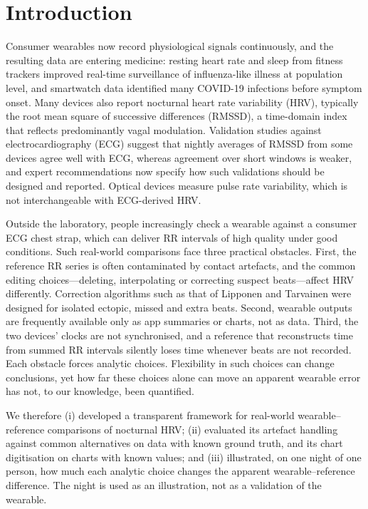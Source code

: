 \documentclass[11pt,a4paper]{article}
\begin{document}
\section{Introduction}
Consumer wearables now record physiological signals continuously, and the resulting data are entering medicine: resting heart rate and sleep from fitness trackers improved real-time surveillance of influenza-like illness at population level,\autocite{radin2020} and smartwatch data identified many COVID-19 infections before symptom onset.\autocite{mishra2020} Many devices also report nocturnal heart rate variability (HRV), typically the root mean square of successive differences (RMSSD), a time-domain index that reflects predominantly vagal modulation.\autocite{taskforce1996,shaffer2017} Validation studies against electrocardiography (ECG) suggest that nightly averages of RMSSD from some devices agree well with ECG, whereas agreement over short windows is weaker,\autocite{stone2021,cao2022} and expert recommendations now specify how such validations should be designed and reported.\autocite{muhlen2021} Optical devices measure pulse rate variability, which is not interchangeable with ECG-derived HRV.\autocite{schafer2013}

Outside the laboratory, people increasingly check a wearable against a consumer ECG chest strap, which can deliver RR intervals of high quality under good conditions.\autocite{gilgen2019} Such real-world comparisons face three practical obstacles. First, the reference RR series is often contaminated by contact artefacts, and the common editing choices---deleting, interpolating or correcting suspect beats---affect HRV differently.\autocite{peltola2012,clifford2005} Correction algorithms such as that of Lipponen and Tarvainen were designed for isolated ectopic, missed and extra beats.\autocite{lipponen2019} Second, wearable outputs are frequently available only as app summaries or charts, not as data. Third, the two devices' clocks are not synchronised, and a reference that reconstructs time from summed RR intervals silently loses time whenever beats are not recorded. Each obstacle forces analytic choices. Flexibility in such choices can change conclusions,\autocite{steegen2016,simonsohn2020} yet how far these choices alone can move an apparent wearable error has not, to our knowledge, been quantified.

We therefore (i) developed a transparent framework for real-world wearable--reference comparisons of nocturnal HRV; (ii) evaluated its artefact handling against common alternatives on data with known ground truth, and its chart digitisation on charts with known values; and (iii) illustrated, on one night of one person, how much each analytic choice changes the apparent wearable--reference difference. The night is used as an illustration, not as a validation of the wearable.
\end{document}
